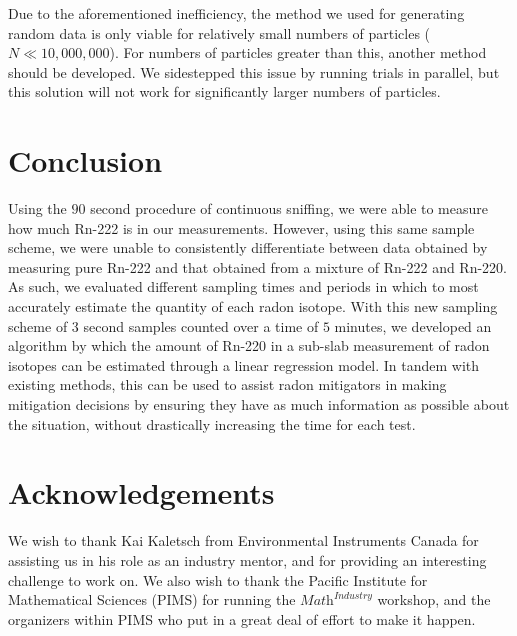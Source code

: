 \documentclass[11pt]{m2pi}
\begin{document}
Due to the aforementioned inefficiency, the method we used for generating random data is only viable for relatively small numbers of particles ($N \ll 10,000,000$). For numbers of particles greater than this, another method should be developed. We sidestepped this issue by running trials in parallel, but this solution will not work for significantly larger numbers of particles.


\section{Conclusion}
Using the $90$ second procedure of continuous sniffing, we were able to measure how much Rn-222 is in our measurements. However, using this same sample scheme, we were unable to consistently differentiate between data obtained by measuring pure Rn-222 and that obtained from a mixture of Rn-222 and Rn-220. As such, we evaluated different sampling times and periods in which to most accurately estimate the quantity of each radon isotope. With this new sampling scheme of $3$ second samples counted over a time of $5$ minutes, we developed an algorithm by which the amount of Rn-220 in a sub-slab measurement of radon isotopes can be estimated through a linear regression model. In tandem with existing methods, this can be used to assist radon mitigators in making mitigation decisions by ensuring they have as much information as possible about the situation, without drastically increasing the time for each test.

\section*{Acknowledgements}
We wish to thank Kai Kaletsch from Environmental Instruments Canada for assisting us in his role as an industry mentor, and for providing an interesting challenge to work on. We also wish to thank the Pacific Institute for Mathematical Sciences (PIMS) for running the $\textit{Math}^\textit{Industry}$ workshop, and the organizers within PIMS who put in a great deal of effort to make it happen.

\newpage
\end{document}

